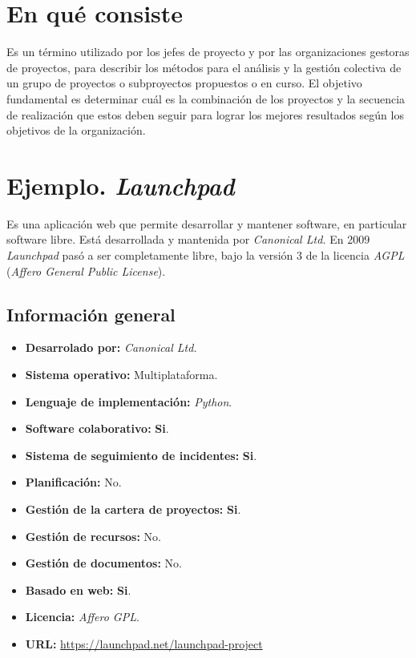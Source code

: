 \documentclass[11pt,a4paper,spanish,twoside]{report}
\begin{document}
\section{En qué consiste}
Es un término utilizado por los jefes de proyecto y por las organizaciones
gestoras de proyectos, para describir los métodos para el análisis y la
gestión colectiva de un grupo de proyectos o subproyectos propuestos o en
curso. El objetivo fundamental es determinar cuál es la combinación de los
proyectos y la secuencia de realización que estos deben seguir para lograr los
mejores resultados según los objetivos de la organización.

\section{Ejemplo. \emph{Launchpad}}
Es una aplicación web que permite desarrollar y mantener software, en
particular software libre. Está desarrollada y mantenida por \emph{Canonical
Ltd.} En 2009 \emph{Launchpad} pasó a ser completamente libre, bajo la
versión 3 de la licencia \emph{AGPL} (\emph{Affero General Public License}).
\cite{WLA}

  \subsection{Información general}
    \begin{itemize}
		\item \textbf{Desarrolado por:} \emph{Canonical Ltd.}
		\item \textbf{Sistema operativo:} Multiplataforma.
		\item \textbf{Lenguaje de implementación:} \emph{Python}.
    \item \textbf{Software colaborativo:} \textbf{Si}.
    \item \textbf{Sistema de seguimiento de incidentes:} \textbf{Si}.
		\item \textbf{Planificación:} No.
		\item \textbf{Gestión de la cartera de proyectos:} \textbf{Si}.
		\item \textbf{Gestión de recursos:} No.
		\item \textbf{Gestión de documentos:} No.
		\item \textbf{Basado en web:} \textbf{Si}.
		\item \textbf{Licencia:} \emph{Affero GPL}.
		\item \textbf{URL:} \url{https://launchpad.net/launchpad-project}
		\end{itemize}
\end{document}
